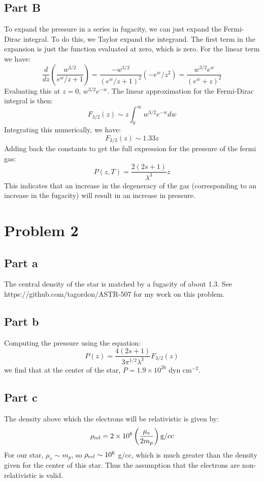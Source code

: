 \documentclass[a4paper, 11pt]{article}
\begin{document}
	\subsection*{Part B}
		To expand the pressure in a series in fugacity, we can just expand the Fermi-Dirac integral. To do 
		this, we Taylor expand the integrand. The first term in the expansion is just the function evaluated 
		at zero, which is zero. For the linear term we have:
		\begin{equation*}
			\frac{d}{dz}\left(\frac{w^{3/2}}{e^w/z + 1}\right) = \frac{-w^{3/2}}{(e^w/z+1)^2}(-e^w/z^2) = \frac{w^{3/2}e^w}{(e^w + z)^2}
		\end{equation*}
		Evaluating this at $z=0$, $w^{3/2}e^{-w}$. The linear approximation for the Fermi-Dirac integral is 
		then:
		\begin{equation*}
			F_{3/2}(z) \sim z\int_0^\infty w^{3/2}e^{-w}dw
		\end{equation*}
		Integrating this numerically, we have:
		\begin{equation*}
			F_{3/2}(z) \sim 1.33z
		\end{equation*} 
		Adding back the constants to get the full expression for the pressure of the fermi gas:
		\begin{equation*}
			P(z, T) = \frac{2(2s+1)}{\lambda^3}z
		\end{equation*}
		This indicates that an increase in the degeneracy of the gas (corresponding to an increase in the 
		fugacity) will result in an increase in pressure. 
\section*{Problem 2}
	\subsection*{Part a}
		The central density of the star is matched by a fugacity of about 1.3. 
		See https://github.com/tagordon/ASTR-507 for my work on this problem. 
	\subsection*{Part b}
		Computing the pressure using the equation:
		\begin{equation*}
			P(z) = \frac{4(2s+1)}{3\pi^{1/2}\lambda^3}F_{3/2}(z)
		\end{equation*}
		we find that at the center of the star, $P = 1.9\times10^{26}$ dyn cm$^{-2}$.
	\subsection*{Part c}
		The density above which the electrons will be relativistic is given by:
		\begin{equation*}
			\rho_\text{rel} = 2\times10^{6}\left(\frac{\mu_e}{2m_p}\right) {\text g/cc}
		\end{equation*}
		For our star, $\mu_e \sim m_p$, so $\rho_{\text rel} \sim 10^6$ g/cc, which is much greater 
		than the density given for the center of this star. Thus the assumption that the electrons 
		are non-relativistic is valid. 
\end{document}
